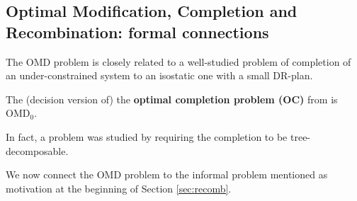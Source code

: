 %
\subsection{Optimal Modification, Completion and Recombination: formal
connections}
%
The OMD problem is closely related to a well-studied problem of
completion of an under-constrained system to an isostatic one with a
small DR-plan.
\begin{observation}\label{obs:OC_to_OMD}
    The (decision version of) the \textbf{optimal completion problem
    (OC)} from \cite{sitharam2005combinatorial,joan-arinyo2003transforming,zhang-gao2006well} is OMD$_0$.
\end{observation}
In fact, a  problem was studied by \cite{joan-arinyo2003transforming}
requiring the completion to be tree-decomposable.

We now connect the OMD problem to the informal  problem mentioned as motivation at the beginning
of Section \ref{sec:recomb}.

